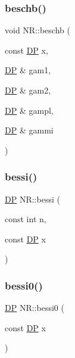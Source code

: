 \subsubsection{\texorpdfstring{beschb()}{beschb()}}
{\footnotesize\ttfamily void N\+R\+::beschb (\begin{DoxyParamCaption}\item[{const \mbox{\hyperlink{namespaceNR_af6ff762dd605ff477b8e52387253a02a}{DP}}}]{x,  }\item[{\mbox{\hyperlink{namespaceNR_af6ff762dd605ff477b8e52387253a02a}{DP}} \&}]{gam1,  }\item[{\mbox{\hyperlink{namespaceNR_af6ff762dd605ff477b8e52387253a02a}{DP}} \&}]{gam2,  }\item[{\mbox{\hyperlink{namespaceNR_af6ff762dd605ff477b8e52387253a02a}{DP}} \&}]{gampl,  }\item[{\mbox{\hyperlink{namespaceNR_af6ff762dd605ff477b8e52387253a02a}{DP}} \&}]{gammi }\end{DoxyParamCaption})}

\mbox{\label{namespaceNR_a17f13d2217a863a186aa76237c3c288b}} 
\subsubsection{\texorpdfstring{bessi()}{bessi()}}
{\footnotesize\ttfamily \mbox{\hyperlink{namespaceNR_af6ff762dd605ff477b8e52387253a02a}{DP}} N\+R\+::bessi (\begin{DoxyParamCaption}\item[{const int}]{n,  }\item[{const \mbox{\hyperlink{namespaceNR_af6ff762dd605ff477b8e52387253a02a}{DP}}}]{x }\end{DoxyParamCaption})}

\mbox{\label{namespaceNR_a225c3ef3fda946f4edce62f5e8b31840}} 
\subsubsection{\texorpdfstring{bessi0()}{bessi0()}}
{\footnotesize\ttfamily \mbox{\hyperlink{namespaceNR_af6ff762dd605ff477b8e52387253a02a}{DP}} N\+R\+::bessi0 (\begin{DoxyParamCaption}\item[{const \mbox{\hyperlink{namespaceNR_af6ff762dd605ff477b8e52387253a02a}{DP}}}]{x }\end{DoxyParamCaption})}

